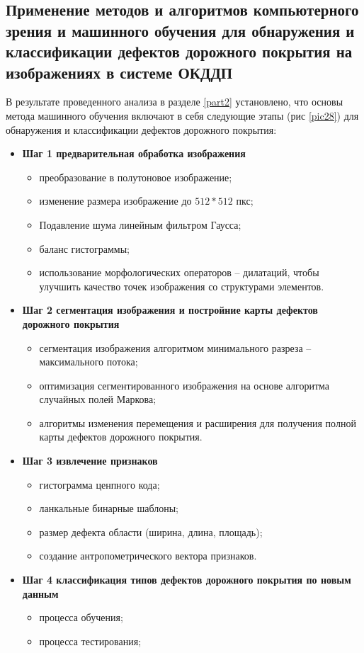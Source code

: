 \documentclass[a4paper,14pt]{extreport}
\begin{document}
\subsection{Применение методов и алгоритмов компьютерного зрения и машинного обучения для обнаружения и классификации дефектов дорожного покрытия  на изображениях в системе ОКДДП} \label{partc}
В результате проведенного анализа в разделе \ref{part2} установлено, что основы метода машинного обучения включают в себя следующие этапы (рис \ref{pic28}) для обнаружения и классификации дефектов дорожного покрытия:

\begin{itemize}
	\item \textbf{Шаг 1 предварительная обработка изображения}
	
	\begin{itemize}
	\item преобразование в полутоновое изображение;
	\item изменение размера изображение до $512*512$ пкс;
	\item Подавление шума линейным фильтром Гаусса; 
	\item баланс гистограммы;
	\item использование морфологических операторов -- дилатаций, чтобы улучшить качество точек изображения со структурами элементов.
	\end{itemize}

\item \textbf{Шаг 2 сегментация изображения и постройние карты дефектов дорожного покрытия}

\begin{itemize}
	\item сегментация изображения алгоритмом минимального разреза -- максимального потока;
	\item оптимизация сегментированного изображения на основе алгоритма случайных полей Маркова;
	\item алгоритмы изменения перемещения и расширения для получения полной карты дефектов дорожного покрытия.
\end{itemize}

\item \textbf{Шаг 3 извлечение признаков}

\begin{itemize}
	\item гистограмма ценпного кода;
	\item ланкальные бинарные шаблоны;
	\item размер дефекта области (ширина, длина, площадь);
	\item создание антропометрического вектора признаков.
\end{itemize}
\item \textbf{Шаг 4 классификация типов дефектов дорожного покрытия по новым данным}
 
 \begin{itemize}
	 \item процесса обучения;
	 \item процесса тестирования;
 \end{itemize}

\end{itemize}
\end{document}
